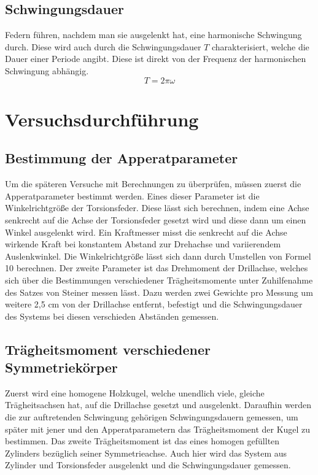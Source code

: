 \documentclass[titlepage = firstcover]{scrartcl}
\begin{document}
      \subsection{Schwingungsdauer}
      Federn führen, nachdem man sie ausgelenkt hat, eine harmonische Schwingung durch. Diese wird auch durch die Schwingungsdauer $T$ charakterisiert,
      welche die Dauer einer Periode angibt. Diese ist direkt von der Frequenz der harmonischen Schwingung abhängig.
      \begin{equation*}
        T = 2\pi \omega
      \end{equation*}
    
    \section{Versuchsdurchführung}
      \subsection{Bestimmung der Apperatparameter}
      Um die späteren Versuche mit Berechnungen zu überprüfen, müssen zuerst die Apperatparameter bestimmt werden. Eines dieser Parameter ist die Winkelrichtgröße 
      der Torsionsfeder. Diese lässt sich berechnen, indem eine Achse senkrecht auf die Achse der Torsionsfeder gesetzt wird und diese dann um einen Winkel
      ausgelenkt wird. Ein Kraftmesser misst die senkrecht auf die Achse wirkende Kraft bei konstantem Abstand zur Drehachse und variierendem Auslenkwinkel. Die 
      Winkelrichtgröße lässt sich dann durch Umstellen von Formel 10 berechnen. Der zweite Parameter ist das Drehmoment der Drillachse, welches sich über 
      die Bestimmungen verschiedener Trägheitsmomente unter Zuhilfenahme des Satzes von Steiner messen lässt. Dazu werden zwei Gewichte pro Messung um weitere 2,5 cm von 
      der  Drillachse entfernt, befestigt und die Schwingungsdauer des Systems bei diesen verschieden Abständen gemessen.

      \subsection{Trägheitsmoment verschiedener Symmetriekörper}
      Zuerst wird eine homogene Holzkugel, welche unendlich viele, gleiche Trägheitsachsen hat, auf die Drillachse gesetzt und ausgelenkt. Daraufhin werden die 
      zur auftretenden Schwingung gehörigen Schwingungsdauern gemessen, um später mit jener und den Apperatparametern das Trägheitsmoment der Kugel zu bestimmen.
      Das zweite Trägheitsmoment ist das eines homogen gefüllten Zylinders bezüglich seiner Symmetrieachse. Auch hier wird das System aus Zylinder und Torsionsfeder
      ausgelenkt und die Schwingungsdauer gemessen.
\end{document}

